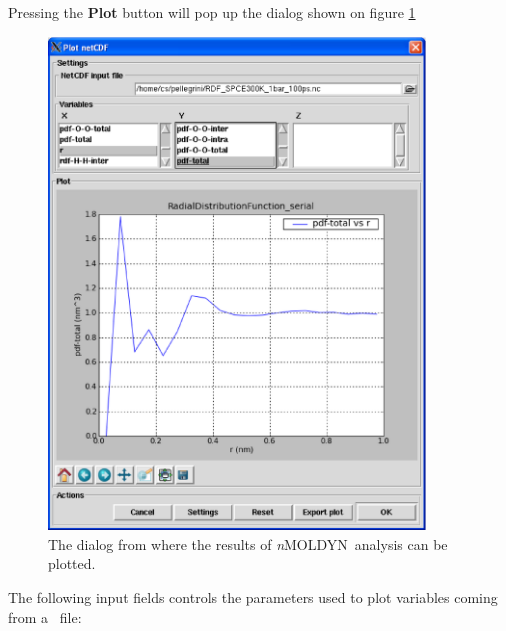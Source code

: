 \documentclass[a4paper,11pt]{report}
\newcommand{\NMOLDYN}{\textit{n}MOLDYN}
\begin{document}
Pressing the \textbf{Plot} button will pop up the dialog shown on figure \ref{fig:plot}
\begin{figure}[h!]
\begin{center}
\includegraphics[width=10cm]{Figures/plot.eps}
\end{center}
\caption[The plot dialog]{The dialog from where the results of \NMOLDYN\ analysis can be plotted.}
\label{fig:plot}
\end{figure}   

The following input fields controls the parameters used to plot variables coming from a \NetCDF\ file:
\end{document}
